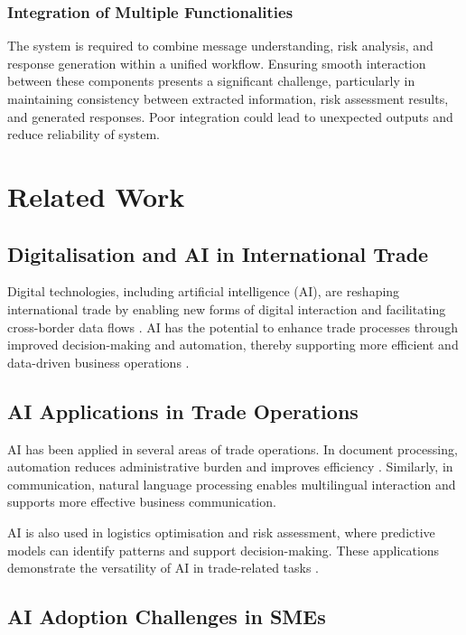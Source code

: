 \documentclass[12pt,a4paper]{report}
\begin{document}
\subsection{Integration of Multiple Functionalities}

The system is required to combine message understanding, risk analysis, and response generation within a unified workflow. Ensuring smooth interaction between these components presents a significant challenge, particularly in maintaining consistency between extracted information, risk assessment results, and generated responses. Poor integration could lead to unexpected outputs and reduce reliability of system.


\chapter{Related Work}

\section{Digitalisation and AI in International Trade}

Digital technologies, including artificial intelligence (AI), are reshaping international trade by enabling new forms of digital interaction and facilitating cross-border data flows \citep{unctad2021}. AI has the potential to enhance trade processes through improved decision-making and automation, thereby supporting more efficient and data-driven business operations \citep{wto2025,oecd_ai_trade}.

\section{AI Applications in Trade Operations}

AI has been applied in several areas of trade operations. In document processing, automation reduces administrative burden and improves efficiency \citep{oecd_doc}. Similarly, in communication, natural language processing enables multilingual interaction and supports more effective business communication.

AI is also used in logistics optimisation and risk assessment, where predictive models can identify patterns and support decision-making. These applications demonstrate the versatility of AI in trade-related tasks \citep{ozturk2024}.

\section{AI Adoption Challenges in SMEs}
\end{document}
